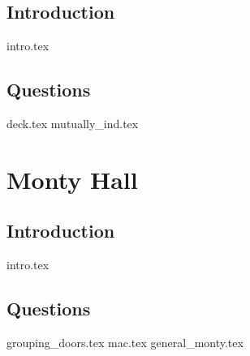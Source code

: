 \documentclass{exam}
\begin{document}
\subsection{Introduction}
{intro.tex}
\subsection{Questions}
\begin{questions}
{deck.tex}
{mutually_ind.tex}
\end{questions}

 \section{Monty Hall}
 \subsection{Introduction}
 {intro.tex}
 \subsection{Questions}
 \begin{questions}
 {grouping_doors.tex}
 {mac.tex}
 {general_monty.tex}
 \end{questions}
\end{document}
